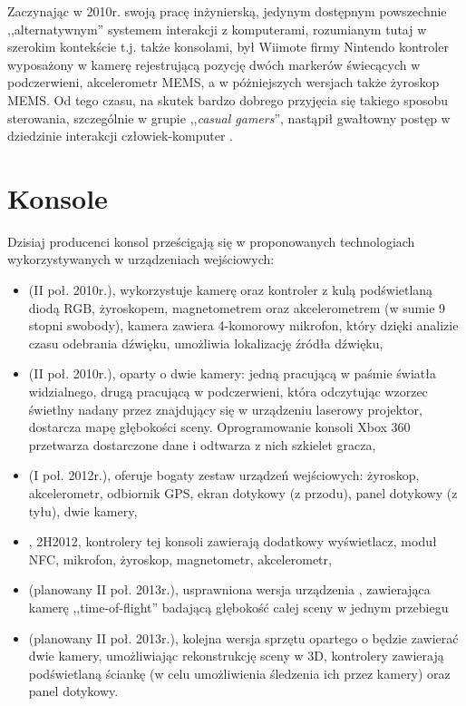 \label{ch:current_state}

Zaczynając w 2010r. swoją pracę inżynierską, jedynym dostępnym powszechnie ,,alternatywnym'' systemem interakcji z komputerami, rozumianym tutaj w szerokim kontekście \ppauza t.j. także konsolami, był Wiimote firmy Nintendo \ppauza kontroler wyposażony w kamerę rejestrującą pozycję dwóch markerów świecących w podczerwieni, akcelerometr MEMS, a w póżniejszych wersjach także żyroskop MEMS. Od tego czasu, na skutek bardzo dobrego przyjęcia się takiego sposobu sterowania, szczególnie w grupie ,,\textit{casual gamers}'', nastąpił gwałtowny postęp w dziedzinie interakcji człowiek-komputer \cite{hcibook,reachout,movtar,behuman}.\\

\section{Konsole}

Dzisiaj producenci konsol prześcigają się w proponowanych technologiach wykorzystywanych w urządzeniach wejściowych:
\begin{itemize}
 \item {} (II poł. 2010r.), wykorzystuje kamerę oraz kontroler z kulą podświetlaną diodą RGB, żyroskopem, magnetometrem oraz akcelerometrem (w sumie 9 stopni swobody), kamera zawiera 4-komorowy mikrofon, który dzięki analizie czasu odebrania dźwięku, umożliwia lokalizację źródła dźwięku,
 \item {} (II poł. 2010r.), oparty o dwie kamery: jedną pracującą w paśmie światła widzialnego, drugą pracującą w podczerwieni, która odczytując wzorzec świetlny nadany przez znajdujący się w urządzeniu laserowy projektor, dostarcza mapę głębokości sceny. Oprogramowanie konsoli Xbox 360 przetwarza dostarczone dane i odtwarza z nich szkielet gracza,
 \item {} (I poł. 2012r.), oferuje bogaty zestaw urządzeń wejściowych: żyroskop, akcelerometr, odbiornik GPS, ekran dotykowy (z przodu), panel dotykowy (z tyłu), dwie kamery,
 \item {}, 2H2012, kontrolery tej konsoli zawierają dodatkowy wyświetlacz, moduł NFC, mikrofon, żyroskop, magnetometr, akcelerometr,
 \item {} (planowany II poł. 2013r.), usprawniona wersja urządzenia , zawierająca kamerę ,,time-of-flight'' badającą głębokość całej sceny w jednym przebiegu
 \item {} (planowany II poł. 2013r.), kolejna wersja sprzętu opartego o  będzie zawierać dwie kamery, umożliwiając rekonstrukcję sceny w 3D, kontrolery zawierają  podświetlaną ściankę (w celu umożliwienia śledzenia ich przez kamery) oraz panel dotykowy.
\end{itemize}

